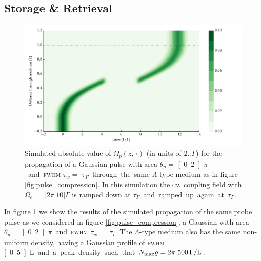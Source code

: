 
  \subsection{Storage \& Retrieval}

    \begin{figure}[]
      \includegraphics[width=\linewidth]
        {figs/04_polaritons/pls_p0_2pi_t1_Ng5e3_c10_gaussian_w0_5_storage_4_fig1.pdf}
      \caption{
        Simulated absolute value of $\Omega_p(z, \tau)$ (in units of $2\pi
        \Gamma$) for the propagation of a Gaussian pulse with area $\theta_p = $
        \unit[0.2]{$\pi$} and \textsc{fwhm} $\tau_w = $ \unit[1]{$\tau_\Gamma$}
        through the same $\Lambda$-type medium as in figure
        \ref{fig:pulse_compression}. In this simulation the \textsc{cw} coupling
        field with $\Omega_c = $ \unit[$2\pi~10$]{$\Gamma$} is ramped down at
        \unit[4]{$\tau_\Gamma$} and ramped up again at \unit[8]{$\tau_\Gamma$}.
      }
      \label{fig:eit_storage}
    \end{figure}

    In figure \ref{fig:eit_storage} we show the results of the simulated
    propagation of the same probe pulse as we considered in figure
    \ref{fig:pulse_compression}, a Gaussian with area $\theta_p = $
    \unit[0.2]{$\pi$} and \textsc{fwhm} $\tau_w = $ \unit[1]{$\tau_\Gamma$}. The
    $\Lambda$-type medium also has the same non-uniform density, having a
    Gaussian profile of \textsc{fwhm} \unit[0.5]{L} and a peak density such that
    $N_{\mathrm{max}} g = \unit[2\pi~500]{\Gamma/L}$.

